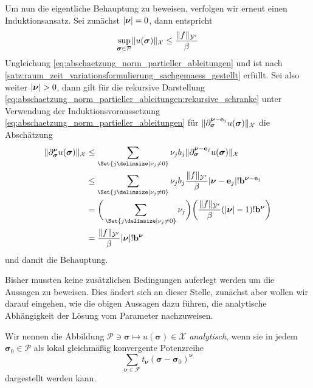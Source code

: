\begin{Satz}
\begin{Beweis}
        Um nun die eigentliche Behauptung zu beweisen, verfolgen wir erneut einen Induktionsansatz.
        Sei zunächst $\lvert\bm\nu\rvert = 0$, dann entspricht
        \begin{equation}
            \sup_{\bm \sigma \in \mathcal P} \lVert u(\bm\sigma)\rVert_{\mathcal X} \leq \frac{\lVert f\rVert_{\mathcal Y'}}{\beta}
        \end{equation}
        Ungleichung \cref{eq:abschaetzung_norm_partieller_ableitungen} und ist nach \cref{satz:raum_zeit_variationsformulierung_sachgemaess_gestellt} erfüllt.
        Sei also weiter $\lvert\bm\nu\rvert > 0$, dann gilt für die rekursive Darstellung \cref{eq:abschaetzung_norm_partieller_ableitungen:rekursive_schranke} unter Verwendung der Induktionsvoraussetzung \cref{eq:abschaetzung_norm_partieller_ableitungen} für $\lVert\partial^{\bm\nu - \mathbf{e}_{j}}_{\bm\sigma} u(\bm\sigma)\rVert_{\mathcal X}$ die Abschätzung
        \begin{align}
            \norm{\partial^{\bm\nu}_{\bm\sigma} u(\bm\sigma)}_{\mathcal X}
            &\leq
            \sum_{\Set{j \given \nu_{j} \neq 0}} \nu_{j} b_{j} \norm{\partial^{\bm\nu - \vec e_{j}}_{\bm\sigma} u(\bm\sigma)}_{\mathcal X}
            \\&\leq
            \sum_{\Set{j \given \nu_{j} \neq 0}} \nu_{j} b_{j} \frac{\norm{f}_{\mathcal Y'}}{\beta} \abs{\bm\nu - \vec e_{j}}! \vec b^{\bm\nu - \vec e_{j}}
            \\&=
            \bigg( \sum_{\Set{j \given \nu_{j} \neq 0}} \nu_{j} \bigg) \bigg( \frac{\norm{f}_{\mathcal Y'}}{\beta} (\abs{\bm\nu} - 1)! \vec b^{\bm\nu} \bigg)
            \\&=
            \frac{\norm{f}_{\mathcal Y'}}{\beta} \abs{\bm\nu}! \vec b^{\bm\nu}
         \end{align}
         und damit die Behauptung.
    \end{Beweis}
\end{Satz}

Bisher mussten keine zusätzlichen Bedingungen auferlegt werden um die Aussagen zu beweisen.
Dies ändert sich an dieser Stelle, zunächst aber wollen wir darauf eingehen, wie die obigen Aussagen dazu führen, die analytische Abhängigkeit der Lösung vom Parameter nachzuweisen.

\begin{Definition}
\label{definition:analytisch}
    Wir nennen die Abbildung $\mathcal P \ni \bm \sigma \mapsto u(\bm \sigma) \in \mathcal X$ \emph{analytisch}, wenn sie in jedem $\bm\sigma_{0} \in \mathcal P$ als lokal gleichmäßig konvergente Potenzreihe
    \begin{equation}
        \sum_{\bm \nu \in \mathcal F} t_{\bm \nu} (\bm \sigma - \bm \sigma_{0})^{\bm \nu}
    \end{equation}
    dargestellt werden kann.
\end{Definition}

